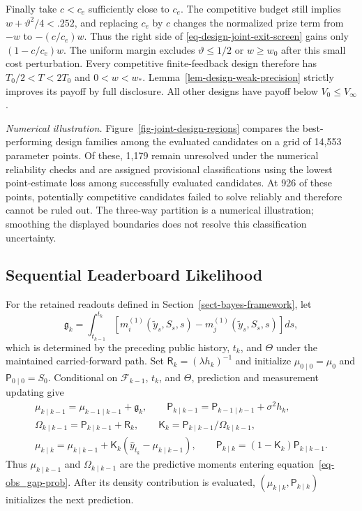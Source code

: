 \documentclass[mnsc]{informs3}
\begin{document}
\begin{APPENDICES}
{Finally take $c<c_e$ sufficiently close to $c_e$.
The competitive budget still implies $w+{\vartheta}^2/4<.252$,
and replacing $c_e$ by $c$ changes the normalized prize term from
$-w$ to $-(c/c_e)w$. Thus the right side of
\eqref{eq-design-joint-exit-screen} gains only $(1-c/c_e)w$.
The uniform margin excludes ${\vartheta}\leq1/2$ or $w\geq w_0$
after this small cost perturbation.
Every competitive finite-feedback design therefore has
$T_0/2<T<2T_0$ and $0<w<w_*$.
Lemma~\ref{lem-design-weak-precision} strictly improves its payoff
by full disclosure. All other designs have payoff below
$V_0\leq V_\infty$.
\Halmos
\endproof

}

\emph{Numerical illustration.}
Figure~\ref{fig-joint-design-regions} compares the best-performing design families among the evaluated candidates on a grid of 14,553 parameter points. Of these, 1,179 remain unresolved under the numerical reliability checks and are assigned provisional classifications using the lowest point-estimate loss among successfully evaluated candidates. At 926 of these points, potentially competitive candidates failed to solve reliably and therefore cannot be ruled out. The three-way partition is a numerical illustration; smoothing the displayed boundaries does not resolve this classification uncertainty.

\subsection{Sequential Leaderboard Likelihood}\label{app-leaderboard-recursion}

For the retained readouts defined in Section~\ref{sect-bayes-framework}, let
\[
\mathfrak g_k=\int_{t_{k-1}}^{t_k}
\left[m_i^{(1)}(\tilde y_s,S_s,s)-m_j^{(1)}(\tilde y_s,S_s,s)\right]ds,
\]
which is determined by the preceding public history, $t_k$, and $\Theta$ under the maintained carried-forward path. Set $\mathsf R_k=(\lambda h_k)^{-1}$ and initialize $\mu_{0\mid0}=\mu_0$ and $\mathsf P_{0\mid0}=S_0$. Conditional on $\mathcal F_{k-1}$, $t_k$, and $\Theta$, prediction and measurement updating give
\[
\begin{gathered}
\mu_{k\mid k-1}=\mu_{k-1\mid k-1}+\mathfrak g_k,\qquad
\mathsf P_{k\mid k-1}=\mathsf P_{k-1\mid k-1}+\sigma^2h_k,\\
\Omega_{k\mid k-1}=\mathsf P_{k\mid k-1}+\mathsf R_k,\qquad
\mathsf K_k=\mathsf P_{k\mid k-1}/\Omega_{k\mid k-1},\\
\mu_{k\mid k}=\mu_{k\mid k-1}
+\mathsf K_k(\hat y_{t_k}-\mu_{k\mid k-1}),\qquad
\mathsf P_{k\mid k}=(1-\mathsf K_k)\mathsf P_{k\mid k-1}.
\end{gathered}
\]
Thus $\mu_{k\mid k-1}$ and $\Omega_{k\mid k-1}$ are the predictive moments entering equation~\eqref{eq-obs_gap-prob}. After its density contribution is evaluated, $(\mu_{k\mid k},\mathsf P_{k\mid k})$ initializes the next prediction.


\end{APPENDICES}
\end{document}
